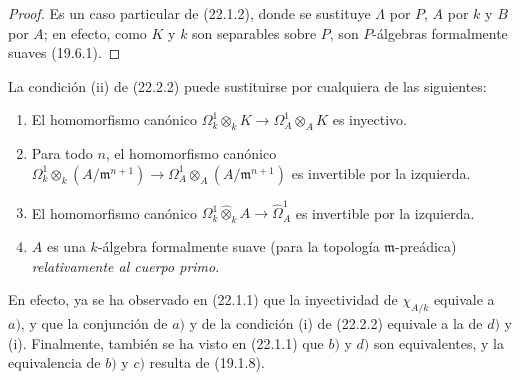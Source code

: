 \begin{proof}
Es un caso particular de (22.1.2), donde se sustituye $\Lambda$ por $P$, $A$
por $k$ y $B$ por $A$; en efecto, como $K$ y $k$ son separables sobre $P$,
son $P$-álgebras formalmente suaves (19.6.1).
\end{proof}

\begin{remark}[22.2.3]
\label{0.22.2.3-fr}
La condición (ii) de (22.2.2) puede sustituirse por cualquiera de las
siguientes:
\begin{enumerate}
  \item[\textit{a)}] El homomorfismo canónico
  $\Omega^1_k\otimes_kK\to\Omega^1_A\otimes_AK$ es inyectivo.
  \item[\textit{b)}] Para todo $n$, el homomorfismo canónico
  $\Omega^1_k\otimes_k(A/\mathfrak m^{n+1})\longrightarrow\Omega^1_A\otimes_A(A/\mathfrak m^{n+1})$
  es invertible por la izquierda.
  \item[\textit{c)}] El homomorfismo canónico
  $\Omega^1_k\widehat\otimes_kA\to\widehat\Omega^1_A$ es invertible por la
  izquierda.
  \item[\textit{d)}] $A$ es una $k$-álgebra formalmente suave (para la topología
  $\mathfrak m$-preádica) \emph{relativamente al cuerpo primo}.
\end{enumerate}
En efecto, ya se ha observado en (22.1.1) que la inyectividad de $\chi_{A/k}$
equivale a $a)$, y que la conjunción de $a)$ y de la condición (i) de (22.2.2)
equivale a la de $d)$ y (i). Finalmente, también se ha visto en (22.1.1) que
$b)$ y $d)$ son equivalentes, y la equivalencia de $b)$ y $c)$ resulta de
(19.1.8).
\end{remark}

